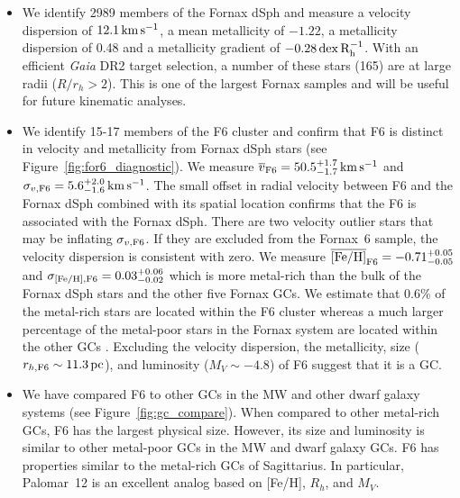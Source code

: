 \documentclass[twocolumn]{aastex63}
\begin{document}
\begin{itemize}
    \item We identify 2989 members of the Fornax dSph and measure a velocity dispersion of $12.1\mathrm{\,km} \mathrm{\,s}^{-1}$, a mean metallicity of $-1.22$, a metallicity dispersion of 0.48 and a metallicity gradient of $-0.28 \, {\rm dex \, R_{h}^{-1}}$.   
With an efficient {\it Gaia} DR2 target selection, a number of these stars (165) are at large radii ($R/r_h > 2$). This is one of the largest Fornax samples and will be useful for future kinematic analyses. 

\item We identify 15-17 members of the F6 cluster and confirm that F6 is distinct in velocity and metallicity from Fornax dSph stars (see Figure~\ref{fig:for6_diagnostic}).
We measure $\overline{v}_{\rm F6} = 50.5_{-1.7}^{+1.7} \mathrm{\,km} \mathrm{\,s}^{-1}$ and $\sigma_{v, {\rm F6}} = 5.6_{-1.6}^{+2.0} \mathrm{\,km} \mathrm{\,s}^{-1}$.  
The small offset in radial velocity between F6 and the Fornax dSph combined with its spatial location confirms that the F6 is associated with the Fornax dSph. 
There are two velocity outlier stars that may be inflating $\sigma_{v, {\rm F6}}$. If they are excluded from the Fornax~6 sample, the velocity dispersion is consistent with zero.
We measure $\overline{\rm [Fe/H]}_{\rm F6} = -0.71_{-0.05}^{+0.05}$ and $\sigma_{\rm [Fe/H], {\rm F6}} = 0.03_{-0.02}^{+0.06}$ which is more metal-rich than the bulk of the Fornax dSph stars and the other five Fornax GCs. 
We estimate that 0.6\% of the metal-rich stars are located within the F6 cluster whereas a much larger percentage of the metal-poor stars in the Fornax system are located within the other GCs \citep[20-25\% are located within F1,F2,F3,F5;][]{Larsen2012A&A...544L..14L}.
Excluding the velocity dispersion,  the metallicity, size ($r_{h, {\rm F6}}\sim11.3\mathrm{\,pc}$), and luminosity ($M_V\sim-4.8$) of F6 suggest that it is a GC. 

\item We have compared F6 to other GCs in the MW and other dwarf galaxy systems (see Figure~\ref{fig:gc_compare}). 
When compared to other metal-rich GCs, F6 has the largest physical size.  However, its size and luminosity is similar to other metal-poor GCs in the MW and dwarf galaxy GCs.
F6 has properties similar to the metal-rich GCs of Sagittarius.  In particular, Palomar~12 is an excellent analog based on [Fe/H], $R_h$, and $M_V$. 


\end{itemize}
\end{document}
